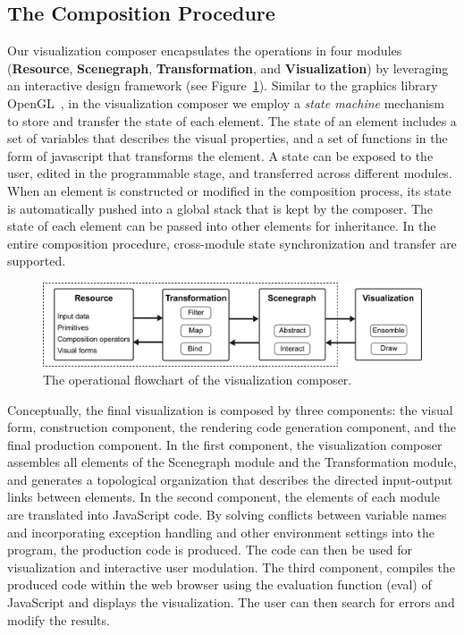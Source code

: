 \subsection{The Composition Procedure}
Our visualization composer
encapsulates the operations in four modules (\textbf{Resource},  \textbf{Scenegraph}, \textbf{Transformation}, and \textbf{Visualization}) by leveraging an interactive design
framework (see Figure~\ref{fg:flowchart}). Similar to the graphics library OpenGL~\cite{OpenGLSL}, in the visualization composer we employ a \emph{state machine} mechanism  to store and transfer the state of each element. The state of an element includes a set of variables that describes the visual properties, and a set of functions  in the form of javascript that transforms the element. A state can be exposed to the user, edited in the programmable stage, and transferred across different modules. When an element is constructed or modified in the composition process, its state is automatically pushed into a global stack that is kept by the composer. The state of each element can be passed into other elements for inheritance. In the entire composition procedure, cross-module state synchronization and transfer are supported.
\begin{figure}[htb]
  \includegraphics[width=0.98\linewidth]{images/composer.eps}
  \caption{The operational flowchart of the visualization composer.} \label{fg:flowchart}
\end{figure}

Conceptually, the final visualization is composed by three components: the visual form, construction component, the rendering code generation component, and the final production component.  In the first component, the visualization composer assembles  all elements of the Scenegraph module and the Transformation module, and generates a topological organization that describes the directed input-output links between elements. In the second component, the elements of each module are translated into JavaScript code. By solving conflicts between variable names and incorporating exception handling and other environment settings into the program, the production code is produced. The code can then be used for visualization and  interactive user modulation. The third component, compiles the produced code within the web browser using the evaluation function (eval) of JavaScript and displays the visualization.  The user can then search for errors and modify the results.


